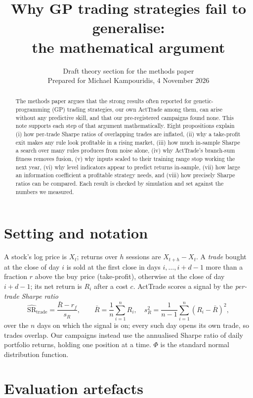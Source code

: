 \documentclass[11pt,a4paper]{article}
\title{Why GP trading strategies fail to generalise:\\ the mathematical argument}
\author{Draft theory section for the methods paper\\ \small Prepared for Michael Kampouridis, 4 November 2026}
\date{}
\theoremstyle{remark}
\newcommand{\SR}{\mathrm{SR}}
\begin{document}
\maketitle

\begin{abstract}
The methods paper argues that the strong results often reported for genetic-programming (GP) trading strategies, our own ActTrade among them, can arise without any predictive skill, and that our pre-registered campaigns found none. This note supports each step of that argument mathematically. Eight propositions explain (i) how per-trade Sharpe ratios of overlapping trades are inflated, (ii) why a take-profit exit makes any rule look profitable in a rising market, (iii) how much in-sample Sharpe a search over many rules produces from noise alone, (iv) why ActTrade's branch-sum fitness removes fusion, (v) why inputs scaled to their training range stop working the next year, (vi) why level indicators appear to predict returns in-sample, (vii) how large an information coefficient a profitable strategy needs, and (viii) how precisely Sharpe ratios can be compared. Each result is checked by simulation and set against the numbers we measured.
\end{abstract}

\section{Setting and notation}
A stock's log price is $X_t$; returns over $h$ sessions are $X_{t+h}-X_t$. A \emph{trade} bought at the close of day $i$ is sold at the first close in days $i,\dots,i+d-1$ more than a fraction $r$ above the buy price (take-profit), otherwise at the close of day $i+d-1$; its net return is $R_i$ after a cost $c$. ActTrade scores a signal by the \emph{per-trade Sharpe ratio}
\begin{equation}
\widehat{\SR}_{\mathrm{trade}} = \frac{\bar R - r_f}{s_R},\qquad \bar R = \frac1n\sum_{i=1}^n R_i,\quad s_R^2=\frac{1}{n-1}\sum_{i=1}^n (R_i-\bar R)^2, \label{eq:srt}
\end{equation}
over the $n$ days on which the signal is on; every such day opens its own trade, so trades overlap. Our campaigns instead use the annualised Sharpe ratio of daily portfolio returns, holding one position at a time. $\Phi$ is the standard normal distribution function.

\section{Evaluation artefacts}
\end{document}
